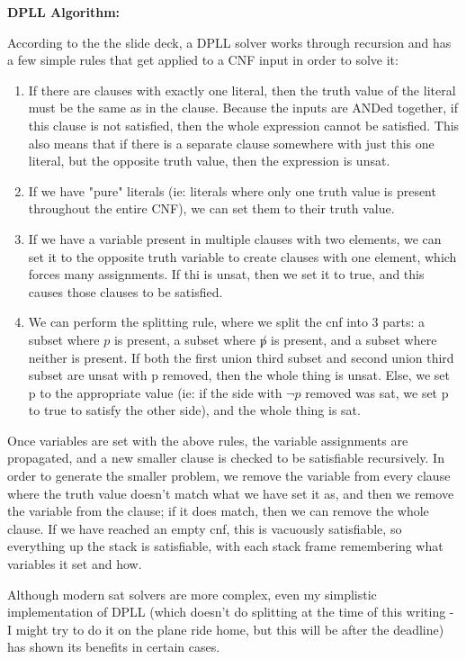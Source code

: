 \documentclass[11pt]{article}
\begin{document}
\begin{flushleft}
{\bf{DPLL Algorithm:}}\medskip

According to the the slide deck, a DPLL solver works through recursion and has a few simple rules that get applied to a CNF input in order to solve it:
\begin{enumerate}
\item If there are clauses with exactly one literal, then the truth value of the literal must be the same as in the clause. Because the inputs are ANDed together, if this clause is not satisfied, then the whole expression cannot be satisfied. This also means that if there is a separate clause somewhere with just this one literal, but the opposite truth value, then the expression is unsat.
\item If we have "pure" literals (ie: literals where only one truth value is present throughout the entire CNF), we can set them to their truth value.
\item If we have a variable present in multiple clauses with two elements, we can set it to the opposite truth variable to create clauses with one element, which forces many assignments. If thi is unsat, then we set it to true, and this causes those clauses to be satisfied.
\item We can perform the splitting rule, where we split the cnf into 3 parts: a subset where $p$ is present, a subset where $\not p$ is present, and a subset where neither is present. If both the first union third subset and second union third subset are unsat with p removed, then the whole thing is unsat. Else, we set p to the appropriate value (ie: if the side with $\neg p$ removed was sat, we set p to true to satisfy the other side), and the whole thing is sat.
\end{enumerate}
Once variables are set with the above rules, the variable assignments are propagated, and a new smaller clause is checked to be satisfiable recursively. In order to generate the smaller problem, we remove the variable from every clause where the truth value doesn't match what we have set it as, and then we remove the variable from the clause; if it does match, then we can remove the whole clause. If we have reached an empty cnf, this is vacuously satisfiable, so everything up the stack is satisfiable, with each stack frame remembering what variables it set and how.\bigskip

Although modern sat solvers are more complex, even my simplistic implementation of DPLL (which doesn't do splitting at the time of this writing - I might try to do it on the plane ride home, but this will be after the deadline) has shown its benefits in certain cases.


\end{flushleft}
\end{document}
